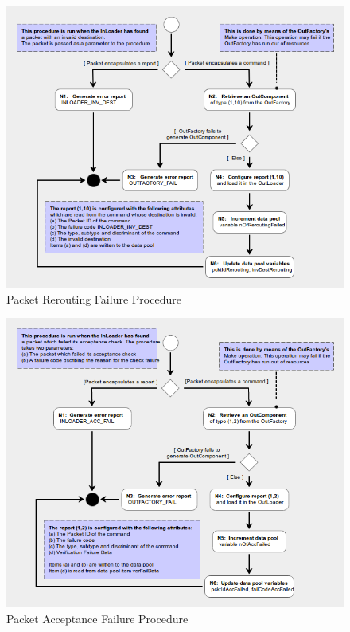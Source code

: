 \documentclass[a4paper,10pt]{article}
\begin{document}
\newpage
\begin{figure}[H]
 \centering
 \includegraphics[scale=0.415,keepaspectratio=true]{CrPsPcktReroutingFail.png}
 \caption{Packet Rerouting Failure Procedure}
 \label{fig:PcktReroutingFail}
\end{figure}

\begin{figure}[htbp]
 \centering
 \includegraphics[scale=0.414,keepaspectratio=true]{CrPsPcktAccFail.png}
 \caption{Packet Acceptance Failure Procedure}
 \label{fig:PcktAccFail}
\end{figure}
\end{document}

